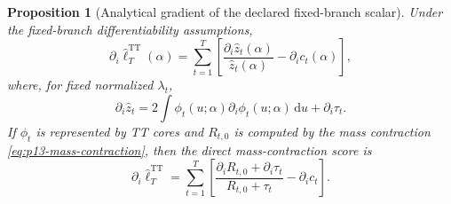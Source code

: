 \documentclass[11pt]{article}
\newcommand{\dd}{\mathrm{d}}
\newcommand{\TT}{\mathrm{TT}}
\newtheorem{proposition}{Proposition}
\theoremstyle{definition}
\theoremstyle{remark}
\begin{document}
\begin{proposition}[Analytical gradient of the declared fixed-branch scalar]
Under the fixed-branch differentiability assumptions,
\[
  \partial_i\widehat\ell_T^{\TT}(\alpha)
  =
  \sum_{t=1}^T
  \left[
  \frac{\partial_i\widehat z_t(\alpha)}{\widehat z_t(\alpha)}
  -
  \partial_i c_t(\alpha)
  \right],
  \label{eq:p13-score-general}
\]
where, for fixed normalized \(\lambda_t\),
\[
  \partial_i\widehat z_t
  =
  2\int
  \phi_t(u;\alpha)\partial_i\phi_t(u;\alpha)\,\dd u
  +
  \partial_i\tau_t.
  \label{eq:p13-zdot-integral}
\]
If \(\phi_t\) is represented by TT cores and \(R_{t,0}\) is computed by the
mass contraction \eqref{eq:p13-mass-contraction}, then the direct
mass-contraction score is
\[
  \boxed{
  \partial_i\widehat\ell_T^{\TT}
  =
  \sum_{t=1}^T
  \left[
  \frac{\partial_iR_{t,0}+\partial_i\tau_t}
       {R_{t,0}+\tau_t}
  -
  \partial_i c_t
  \right].
  }
  \label{eq:p13-final-score}
\]
\end{proposition}
\end{document}
